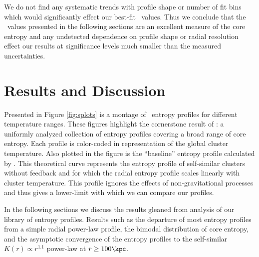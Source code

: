 \documentclass{emulateapj}
\begin{document}
We do not find any systematic trends with profile shape or number of
fit bins which would significantly effect our best-fit \kna\
values. Thus we conclude that the \kna\ values presented in the
following sections are an excellent measure of the core entropy and
any undetected dependence on profile shape or radial resolution effect
our results at significance levels much smaller than the measured
uncertainties.


\section{Results and Discussion}
\label{sec:r&d}

Presented in Figure \ref{fig:splots} is a montage of \accept\ entropy
profiles for different temperature ranges. These figures highlight the
cornerstone result of \accept: a uniformly analyzed collection of
entropy profiles covering a broad range of core entropy. Each profile
is color-coded in representation of the global cluster
temperature. Also plotted in the figure is the ``baseline'' entropy
profile calculated by \cite{vkb05}. This theoretical curve represents
the entropy profile of self-similar clusters without feedback and for
which the radial entropy profile scales linearly with cluster
temperature. This profile ignores the effects of non-gravitational
processes and thus gives a lower-limit with which we can compare our
profiles.

In the following sections we discuss the results gleaned from analysis
of our library of entropy profiles. Results such as the departure of
most entropy profiles from a simple radial power-law profile, the
bimodal distribution of core entropy, and the asymptotic convergence
of the entropy profiles to the self-similar $K(r) \propto r^{1.1}$
power-law at $r \geq 100\kpc$.
\end{document}
